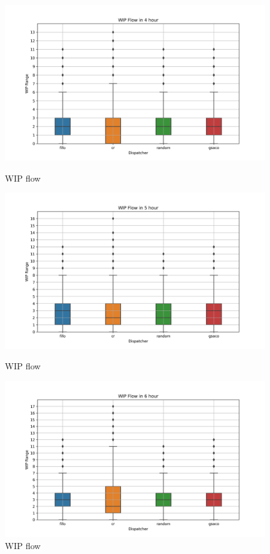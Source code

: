 \documentclass[runningheads]{llncs}
\begin{document}
\begin{figure}[t]
	\centering
	\begin{minipage}{0.32\textwidth}
		\includegraphics[width=\textwidth]{period_14400s.png}
		\caption{WIP flow}
		\label{fig:p4}
	\end{minipage}\hfill
	\begin{minipage}{0.32\textwidth}
		\includegraphics[width=\textwidth]{period_18000s.png}
		\caption{WIP flow}
		\label{fig:p5}
	\end{minipage}\hfill
	\begin{minipage}{0.32\textwidth}
		\includegraphics[width=\textwidth]{period_21600s.png}
		\caption{WIP flow}
		\label{fig:p6}
	\end{minipage}
\end{figure}
\end{document}
